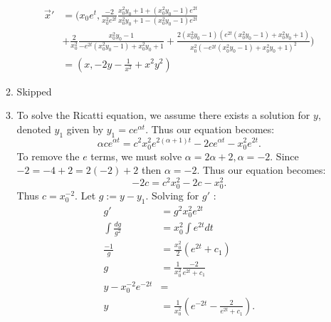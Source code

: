 \documentclass[12pt, letterpaper]{article}
\begin{document}
\begin{enumerate}
\begin{enumerate}
				\begin{align*}
				\Vec{x}' &= (x_0 e^t, \frac{-2}{x_0^2 e^{2t}}\frac{x_0^2 y_0+1+(x_0^2 y_0-1)e^{2t}}{x_0^2 y_0+1-(x_0^2 y_0-1)e^{2t}}\\
				&+ \frac{2}{x_0^2}\frac{x_0^2 y_0 - 1}{-e^{2t}(x_0^2 y_0-1)+x_0^2 y_0+1}+\frac{2(x_0^2 y_0-1)(e^{2t}(x_0^2 y_0-1)+x_0^2 y_0+1)}{x_0^2(-e^{2t}(x_0^2 y_0-1)+x_0^2 y_0+1)^2})\\
				&= (x,-2y - \frac{1}{x^2} + x^2 y^2) 		
				\end{align*}
			\item Skipped
			\item To solve the Ricatti equation, we assume  there exists a solution for $y$, denoted $y_1$ given by $y_1 =c e^{\alpha t}$.  Thus our equation becomes:
			$$
			\alpha c e^{\alpha t} = c^2 x_0^2 e^{2(\alpha + 1)t} - 2 ce^{\alpha t} - x_0^2 e^{2t}.			
			$$
			To remove the $e$ terms, we must solve $\alpha = 2\alpha + 2, \alpha = -2$.  Since $-2 = -4 + 2 = 2(-2) + 2$ then $\alpha = -2$.  Thus our equation becomes:
			$$
			-2c = c^2 x_0^2 -2c -x_0^2.			
			$$
			Thus $c = x_0^{-2}$.  Let $g := y - y_1$.  Solving for $g'$ :
			\begin{align*}
				g' &= g^2 x_0^2 e^{2t}\\
				\int \frac{dg}{g^2} &= x_0^2 \int e^{2t}dt\\
				\frac{-1}{g} &= \frac{x_0^2}{2}(e^{2t} + c_1)\\
				g &= \frac{1}{x_0^2}\frac{-2}{e^{2t}+c_1}\\ 
				y - x_0^{-2}e^{-2t}  &= \\
				y &= \frac{1}{x_0^2} \left( e^{-2t} - \frac{2}{e^{2t}+c_1}\right).
			\end{align*}
			

\end{enumerate}
\end{enumerate}
\end{document}
